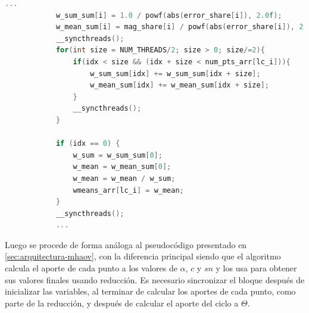 \begin{lstlisting}[language=C++]
            ...
            w_sum_sum[i] = 1.0 / powf(abs(error_share[i]), 2.0f);
            w_mean_sum[i] = mag_share[i] / powf(abs(error_share[i]), 2.0f); }
            __syncthreads();
            for(int size = NUM_THREADS/2; size > 0; size/=2){
                if(idx < size && (idx + size < num_pts_arr[lc_i])){
                    w_sum_sum[idx] += w_sum_sum[idx + size];
                    w_mean_sum[idx] += w_mean_sum[idx + size];
                }
                __syncthreads();
            }

            if (idx == 0) {
                w_sum = w_sum_sum[0];
                w_mean = w_mean_sum[0];
                w_mean = w_mean / w_sum;
                wmeans_arr[lc_i] = w_mean;
            }
            __syncthreads();
            ...
\end{lstlisting}
Luego se procede de forma análoga al pseudocódigo presentado en \ref{sec:arquitectura-mhaov}, con la diferencia principal siendo que el algoritmo calcula el aporte de cada punto a los valores de $\alpha$, $c$ y $sn$ y los usa para obtener sus valores finales usando reducción. Es necesario sincronizar el bloque después de inicializar las variables, al terminar de calcular los aportes de cada punto, como parte de la reducción, y después de calcular el aporte del ciclo a $\Theta$.
